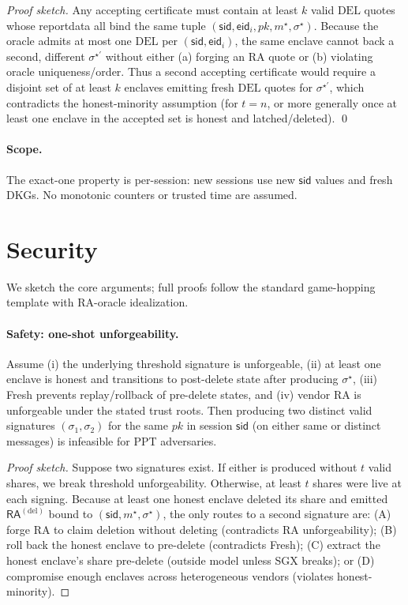 \documentclass[runningheads,orivec]{llncs}
\newcommand{\sid}{\mathsf{sid}}
\newcommand{\RA}{\mathsf{RA}}
\begin{document}
\emph{Proof sketch.} Any accepting certificate must contain at least $k$ valid $\mathrm{DEL}$ quotes whose reportdata all bind the same tuple $(\sid,\mathsf{eid}_i,pk,m^{\star},\sigma^{\star})$. Because the oracle admits at most one $\mathrm{DEL}$ per $(\sid,\mathsf{eid}_i)$, the same enclave cannot back a second, different $\sigma^{\star'}$ without either (a) forging an RA quote or (b) violating oracle uniqueness/order. Thus a second accepting certificate would require a disjoint set of at least $k$ enclaves emitting fresh $\mathrm{DEL}$ quotes for $\sigma^{\star'}$, which contradicts the honest-minority assumption (for $t\!=\!n$, or more generally once at least one enclave in the accepted set is honest and latched/deleted). \qed

\paragraph{Scope.}
The exact-one property is per-session: new sessions use new $\sid$ values and fresh DKGs. No monotonic counters or trusted time are assumed.

\section{Security}\label{sec:security}
We sketch the core arguments; full proofs follow the standard game-hopping template with RA-oracle idealization.

\paragraph{Safety: one-shot unforgeability.}
\begin{theorem}\label{thm:one-shot}
Assume (i) the underlying threshold signature is unforgeable, (ii) at least one enclave is honest and transitions to post-delete state after producing $\sigma^{\star}$, (iii) \textsf{Fresh} prevents replay/rollback of pre-delete states, and (iv) vendor RA is unforgeable under the stated trust roots. Then producing two distinct valid signatures $(\sigma_1,\sigma_2)$ for the same $pk$ in session $\mathsf{sid}$ (on either same or distinct messages) is infeasible for PPT adversaries.
\end{theorem}

\begin{proof}[Proof sketch]
Suppose two signatures exist. If either is produced without $t$ valid shares, we break threshold unforgeability. Otherwise, at least $t$ shares were live at each signing. Because at least one honest enclave deleted its share and emitted $\RA^{(\mathrm{del})}$ bound to $(\mathsf{sid},m^{\star},\sigma^{\star})$, the only routes to a second signature are: (A) forge RA to claim deletion without deleting (contradicts RA unforgeability); (B) roll back the honest enclave to pre-delete (contradicts \textsf{Fresh}); (C) extract the honest enclave's share pre-delete (outside model unless SGX breaks); or (D) compromise enough enclaves across heterogeneous vendors (violates honest-minority).
\end{proof}
\end{document}
